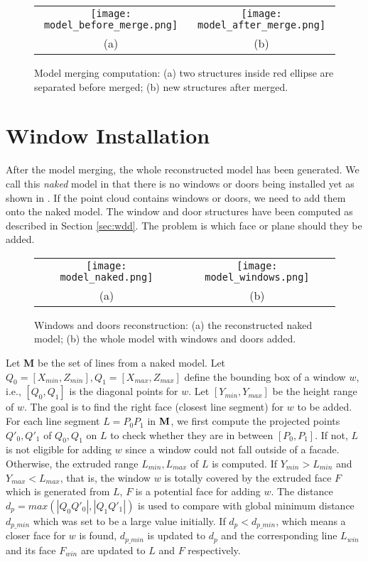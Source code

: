 \begin{figure} [htbp]
\begin{center}
\begin{tabular}{cc}
\texttt{[image: model\_before\_merge.png]} &
\texttt{[image: model\_after\_merge.png]} \\
(a) & (b)
\end{tabular}
\end{center}
\caption{ Model merging computation:
      (a) two structures inside red ellipse are separated before merged;
      (b) new structures after merged. }
\label{fig:MR_Fig2}
\end{figure}

\section{Window Installation}

After the model merging, the whole reconstructed model has been generated.
We call this {\it naked} model in that there is no windows or doors
being installed yet as shown in .
If the point cloud contains windows or doors,
we need to add them onto the naked model.
The window and door structures have been computed as described in Section \ref{sec:wdd}.
The problem is which face or plane should they be added.

\begin{figure} [htbp]
\begin{center}
\begin{tabular}{cc}
\texttt{[image: model\_naked.png]} &
\texttt{[image: model\_windows.png]} \\
(a) & (b)
\end{tabular}
\end{center}
\caption{ Windows and doors reconstruction:
      (a) the reconstructed naked model;
      (b) the whole model with windows and doors added.}
\label{fig:WDR_Fig1}
\end{figure}

Let {\bf M} be the set of lines from a naked model.
Let $Q_0 = [X_{min}, Z_{min}], Q_1 = [X_{max}, Z_{max}]$
define the bounding box of a window $w$,
i.e., $[Q_0, Q_1]$ is the diagonal points for $w$.
Let $[Y_{min}, Y_{max}]$ be the height range of $w$.
The goal is to find the right face (closest line segment) for $w$ to be added.
For each line segment $L = P_0P_1 $ in ${\bf M}$,
we first compute the projected points $Q'_0, Q'_1$
of $Q_0, Q_1$ on $L$ to check whether they are in between $[P_0, P_1]$.
If not, $L$ is not eligible for adding $w$
since a window could not fall outside of a facade.
Otherwise, the extruded range $L_{min}, L_{max}$ of $L$ is computed.
If $Y_{min} > L_{min}$ and $Y_{max} < L_{max}$,
that is, the window $w$ is totally covered by the
extruded face $F$ which is generated from $L$,
$F$ is a potential face for adding $w$.
The distance $d_p = max(|Q_0Q'_0|, |Q_1Q'_1|)$ is used
to compare with global minimum distance $d_{p\_min}$
which was set to be a large value initially.
If $d_p < d_{p\_min}$, which means a closer face for $w$ is found,
$d_{p\_min}$ is updated to $d_p$ and
the corresponding line $L_{win}$ and its face $F_{win}$
are updated to $L$ and $F$ respectively.

